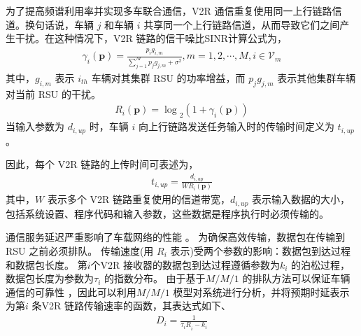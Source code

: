 为了提高频谱利用率并实现多车联合通信，V2R 通信重复使用同一上行链路信道。换句话说，车辆 $j$ 和车辆 $i$ 共享同一个上行链路信道，从而导致它们之间产生干扰。在这种情况下，V2R 链路的信干噪比SINR计算公式为，
\begin{eqnarray}\label{E3-3}
\gamma_i\left(\mathbf{p}\right)=\frac{p_ig_{i,m}}{{\sum_{j=1}^{M}{p_jg_{j,m}}+\sigma^2}}, m=1,2,\cdots ,M , i\in {{\mathcal{V}}_{m}}
\end{eqnarray}
其中，$g_{i,m}$ 表示 $i_{th}$ 车辆对其集群 RSU 的功率增益，而 ${p_jg_{j,m}}$ 表示其他集群车辆对当前 RSU 的干扰。
\begin{eqnarray}\label{E3-4}
{R_i\left(\mathbf{p}\right)=\log}_2{\left(1+ \gamma_i\left(\mathbf{p}\right) \right)}
\end{eqnarray}
当输入参数为 $d_{i,up}$ 时，车辆 $i$ 向上行链路发送任务输入时的传输时间定义为 $t_{i,up}$。

因此，每个 V2R 链路的上传时间可表述为，
\begin{eqnarray}\label{E3-5}
t_{i,up}=\frac{d_{i,up}}{WR_i\left(\mathbf{p}\right)}
\end{eqnarray}
其中，$W$ 表示多个 V2R 链路重复使用的信道带宽，$d_{i,up}$ 表示输入数据的大小，包括系统设置、程序代码和输入参数，这些数据是程序执行时必须传输的。

通信服务延迟严重影响了车载网络的性能 \supercite{RAI}。 为确保高效传输，数据包在传输到 RSU 之前必须排队。 传输速度(用 $R_i$ 表示)受两个参数的影响：数据包到达过程和数据包长度。  第$i$个V2R 接收器的数据包到达过程遵循参数为$k_i$ 的泊松过程，数据包长度为参数为$\tau_i$ 的指数分布。 由于基于$M/M/1$ 的排队方法可以保证车辆通信的可靠性 \supercite{Guo2019}，因此可以利用$M/M/1$ 模型对系统进行分析，并将预期时延表示为第$i$ 条V2R 链路传输速率的函数，其表达式如下、
\begin{eqnarray}\label{E3-6}
D_i=\frac{1}{{\tau_iR}_i-k_i}
\end{eqnarray}

